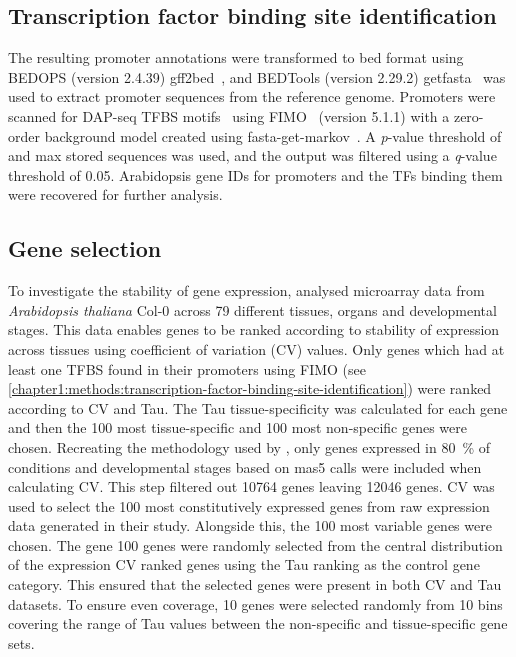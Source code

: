\documentclass[../main.tex]{subfiles}
\begin{document}
\subsection{Transcription factor binding site identification}
\label{chapter1:methods:transcription-factor-binding-site-identification}
The resulting promoter annotations were transformed to bed format using BEDOPS (version 2.4.39) gff2bed~\autocite{nephBEDOPSHighperformanceGenomic2012}, and BEDTools (version 2.29.2) getfasta~\autocite{quinlanBEDToolsFlexibleSuite2010} was used to extract promoter sequences from the reference genome.
Promoters were scanned for DAP\hyp{}seq TFBS motifs~\autocite{omalleyCistromeEpicistromeFeatures2016} using FIMO~\autocite{grantFIMOScanningOccurrences2011} (version 5.1.1) with a zero\hyp{}order background model created using fasta\hyp{}get\hyp{}markov~\autocite{baileyMEMESuiteTools2009}.
A \textit{p}\hyp{}value threshold of  and max stored sequences  was used, and the output was filtered using a \textit{q}\hyp{}value threshold of 0.05.
Arabidopsis gene IDs for promoters and the TFs binding them were recovered for further analysis.

\subsection{Gene selection}\label{chapter1:methods:gene-selection}

To investigate the stability of gene expression, \textcite*{czechowskiGenomeWideIdentificationTesting2005} analysed microarray data from \textit{Arabidopsis thaliana} Col-0 across 79 different tissues, organs and developmental stages.
This data enables genes to be ranked according to stability of expression across tissues using coefficient of variation (CV) values.
Only genes which had at least one TFBS found in their promoters using FIMO (see \autoref{chapter1:methods:transcription-factor-binding-site-identification}) were ranked according to CV and Tau.
The Tau tissue\hyp{}specificity \autocite{yanaiGenomewideMidrangeTranscription2005} was calculated for each gene and then the 100 most tissue\hyp{}specific and 100 most non\hyp{}specific genes were chosen.
Recreating the methodology used by \textcite*{czechowskiGenomeWideIdentificationTesting2005}, only genes expressed in \SI{80}{\percent} of conditions and developmental stages based on mas5 calls were included when calculating CV.
This step filtered out 10764 genes leaving 12046 genes.
CV was used to select the 100 most constitutively expressed genes from raw expression data generated in their study.
Alongside this, the 100 most variable genes were chosen.
The gene
100 genes were randomly selected from the central distribution of the expression CV ranked genes using the Tau ranking as the control gene category.
This ensured that the selected genes were present in both CV and Tau datasets.
To ensure even coverage, 10 genes were selected randomly from 10 bins covering the range of Tau values between the non\hyp{}specific and tissue\hyp{}specific gene sets.
\end{document}
